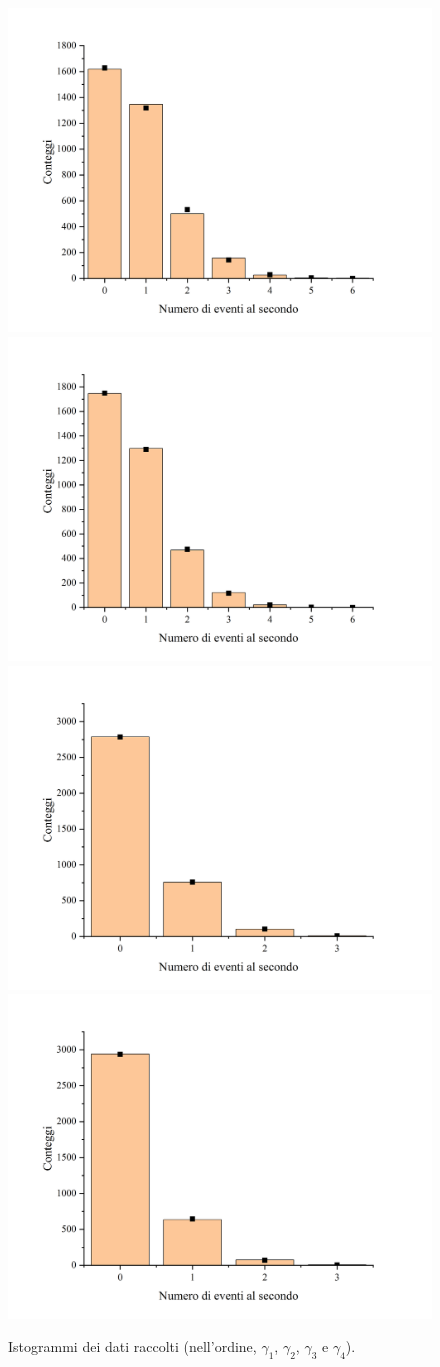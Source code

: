 \documentclass{article}
\begin{document}
\begin{center}
    \begin{figure}[H]
        \includegraphics[trim={2cm .5cm 2.4cm 2.1cm},clip,width=.5\textwidth]{img/Geiger2.jpg}
        \includegraphics[trim={2cm .5cm 2.4cm 2.1cm},clip,width=.5\textwidth]{img/Geiger1.jpg}
        \includegraphics[trim={2cm .5cm 2.4cm 2.1cm},clip,width=.5\textwidth]{img/Geiger4.jpg}
        \includegraphics[trim={2cm .5cm 2.4cm 2.1cm},clip,width=.5\textwidth]{img/Geiger5.jpg}
        \caption{
            Istogrammi dei dati raccolti (nell'ordine, $\gamma_1$, $\gamma_2$, $\gamma_3$ e $\gamma_4$).\\
}
\end{figure}
\end{center}
\end{document}
